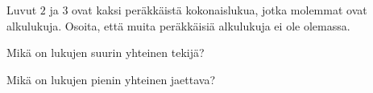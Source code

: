 \begin{tehtava}
    Luvut $2$ ja $3$ ovat kaksi peräkkäistä kokonaislukua, jotka molemmat ovat alkulukuja. Osoita, että muita peräkkäisiä alkulukuja ei ole olemassa.
\end{tehtava}

\begin{tehtava}
    Mikä on lukujen suurin yhteinen tekijä?
    
    \begin{alakohdat}
    \end{alakohdat}
    
    \begin{vastaus}
        \begin{alakohdat}
        \end{alakohdat}
    \end{vastaus}
    
\end{tehtava}

\begin{tehtava}
    Mikä on lukujen pienin yhteinen jaettava?
    
    \begin{alakohdat}
    \end{alakohdat}
    
    \begin{vastaus}
        \begin{alakohdat}
        \end{alakohdat}
    \end{vastaus}
    
\end{tehtava}

